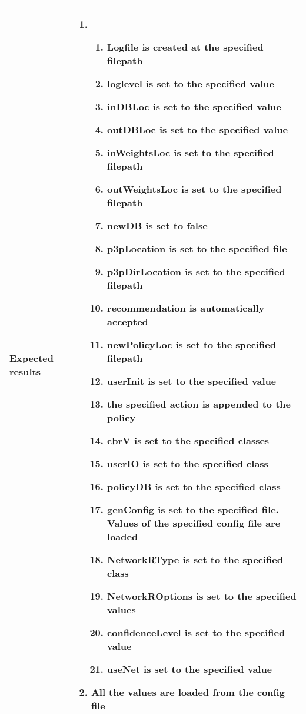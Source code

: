 \begin{center}
\begin{longtable}{ | p{4cm} | p{10cm} | }
			Expected results & 	\begin{enumerate}
							\item
							\begin{enumerate}
								\item Logfile is created at the specified filepath
								\item loglevel is set to the specified value
								\item inDBLoc is set to the specified value
								\item outDBLoc is set to the specified value
								\item inWeightsLoc is set to the specified filepath
								\item outWeightsLoc is set to the specified filepath
								\item newDB is set to false
								\item p3pLocation is set to the specified file
								\item p3pDirLocation is set to the specified filepath
								\item recommendation is automatically accepted
								\item newPolicyLoc is set to the specified filepath
								\item userInit is set to the specified value
								\item the specified action is appended to the policy
								\item cbrV is set to the specified classes
								\item userIO is set to the specified class
								\item policyDB is set to the specified class
								\item genConfig is set to the specified file. Values of the specified config file are loaded
								\item NetworkRType is set to the specified class
								\item NetworkROptions is set to the specified values
								\item confidenceLevel is set to the specified value
								\item useNet is set to the specified value
							\end{enumerate}
							\item All the values are loaded from the config file
						\end{enumerate} \\ [3pt] \hline


\end{longtable}
\end{center}
